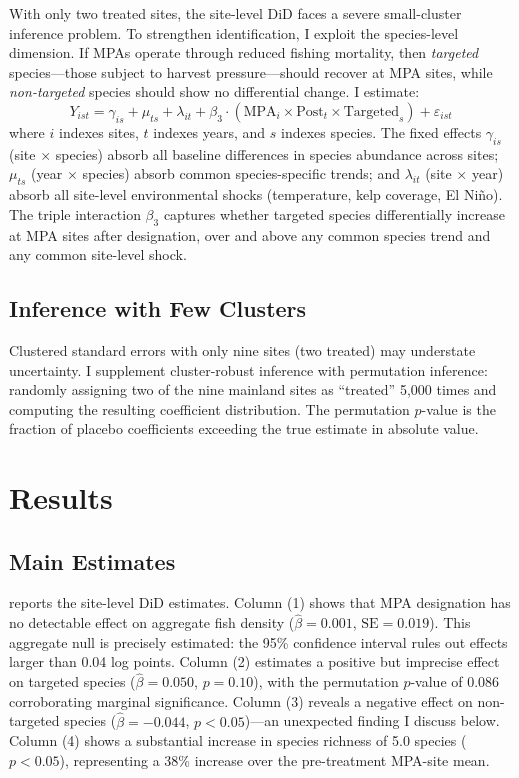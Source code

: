 \documentclass[12pt]{article}
\begin{document}
With only two treated sites, the site-level DiD faces a severe small-cluster inference problem. To strengthen identification, I exploit the species-level dimension. If MPAs operate through reduced fishing mortality, then \textit{targeted} species---those subject to harvest pressure---should recover at MPA sites, while \textit{non-targeted} species should show no differential change. I estimate:
\begin{equation}
\label{eq:ddd}
Y_{ist} = \gamma_{is} + \mu_{ts} + \lambda_{it} + \beta_3 \cdot (\text{MPA}_i \times \text{Post}_t \times \text{Targeted}_s) + \varepsilon_{ist}
\end{equation}
where $i$ indexes sites, $t$ indexes years, and $s$ indexes species. The fixed effects $\gamma_{is}$ (site $\times$ species) absorb all baseline differences in species abundance across sites; $\mu_{ts}$ (year $\times$ species) absorb common species-specific trends; and $\lambda_{it}$ (site $\times$ year) absorb all site-level environmental shocks (temperature, kelp coverage, El Ni\~no). The triple interaction $\beta_3$ captures whether targeted species differentially increase at MPA sites after designation, over and above any common species trend and any common site-level shock.

\subsection{Inference with Few Clusters}

Clustered standard errors with only nine sites (two treated) may understate uncertainty. I supplement cluster-robust inference with permutation inference: randomly assigning two of the nine mainland sites as ``treated'' 5,000 times and computing the resulting coefficient distribution. The permutation $p$-value is the fraction of placebo coefficients exceeding the true estimate in absolute value.


\section{Results}
\label{sec:results}

\subsection{Main Estimates}



 reports the site-level DiD estimates. Column (1) shows that MPA designation has no detectable effect on aggregate fish density ($\hat{\beta} = 0.001$, $\text{SE} = 0.019$). This aggregate null is precisely estimated: the 95\% confidence interval rules out effects larger than 0.04 log points. Column (2) estimates a positive but imprecise effect on targeted species ($\hat{\beta} = 0.050$, $p = 0.10$), with the permutation $p$-value of 0.086 corroborating marginal significance. Column (3) reveals a negative effect on non-targeted species ($\hat{\beta} = -0.044$, $p < 0.05$)---an unexpected finding I discuss below. Column (4) shows a substantial increase in species richness of 5.0 species ($p < 0.05$), representing a 38\% increase over the pre-treatment MPA-site mean.
\end{document}
